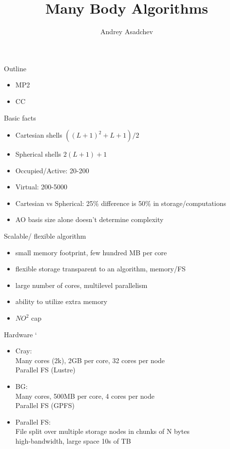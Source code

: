 \documentclass{beamer}
\title[MP2/CC]{Many Body Algorithms}
\author{ Andrey Asadchev}
\institute{Iowa State University}
\begin{document}
\begin{frame}
  \titlepage
\end{frame}


\begin{frame}{Outline}
  \begin{itemize}
  \item MP2
  \item CC
  \end{itemize}
\end{frame}

\begin{frame}{Basic facts}
  \begin{itemize}
  \item Cartesian shells $((L+1)^2+L+1)/2$
  \item Spherical shells $2(L+1) + 1$
  \item Occupied/Active: 20-200
  \item Virtual: 200-5000
  \item Cartesian vs Spherical:  25\% difference is 50\% in storage/computations
  \item AO basis size alone doesn't determine complexity
  \end{itemize}
\end{frame}


\begin{frame}{ Scalable/ flexible algorithm}
  \begin{itemize}
  \item small memory footprint, few hundred MB per core
  \item flexible storage transparent to an algorithm, memory/FS
  \item large number of cores, multilevel parallelism
  \item ability to utilize extra memory
  \item $NO^2$ cap
\end{itemize}
\end{frame}

\begin{frame}{Hardware}
`\begin{itemize}
  \item Cray: \\
    Many cores (2k), 2GB per core, 32 cores per node \\
    Parallel FS (Lustre) \\
  \item BG: \\
    Many cores, 500MB per core, 4 cores per node \\
    Parallel FS (GPFS) \\
  \item Parallel FS: \\
    File split over multiple storage nodes in chunks of N bytes \\
    high-bandwidth, large space 10s of TB
  \end{itemize}
\end{frame}
\end{document}
